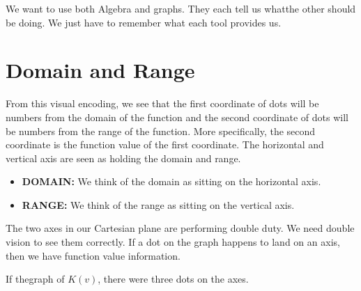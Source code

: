 \documentclass{ximera}
\begin{document}
We want to use both Algebra and graphs.  They each tell us whatthe other should be doing.  We just have to remember what each tool provides us.










\section{Domain and Range}


From this visual encoding, we see that the first coordinate of dots will be numbers from the domain of the function and the second coordinate of dots will be numbers from the range of the function.  More specifically, the second coordinate is the function value of the first coordinate.  The horizontal and vertical axis are seen as holding the domain and range.

\begin{itemize}
\item \textbf{DOMAIN:} We think of the domain as sitting on the horizontal axis.
\item \textbf{RANGE:} We think of the range as sitting on the vertical axis.
\end{itemize}


The two axes in our Cartesian plane are performing double duty.  We need double vision to see them correctly. If a dot on the graph happens to land on an axis, then we have function value information.

If thegraph of $K(v)$, there were three dots on the axes.

\begin{image}
\end{image}
\end{document}
